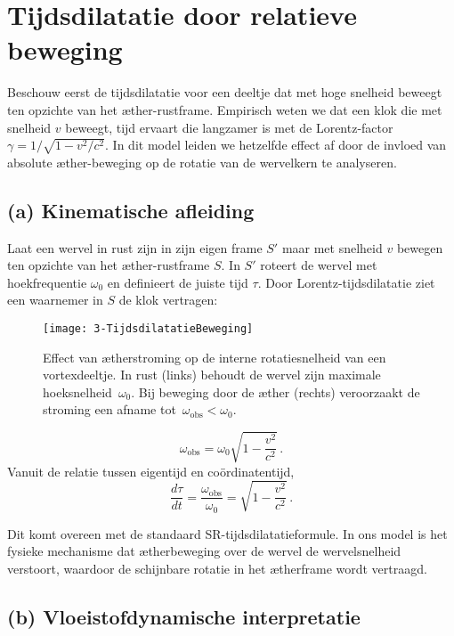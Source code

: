 \section{Tijdsdilatatie door relatieve beweging}

Beschouw eerst de tijdsdilatatie voor een deeltje dat met hoge snelheid beweegt ten opzichte van het æther-rustframe. Empirisch weten we dat een klok die met snelheid $v$ beweegt, tijd ervaart die langzamer is met de Lorentz-factor $\gamma = 1/\sqrt{1 - v^2/c^2}$. In dit model leiden we hetzelfde effect af door de invloed van absolute æther-beweging op de rotatie van de wervelkern te analyseren.

\subsection*{(a) Kinematische afleiding}

Laat een wervel in rust zijn in zijn eigen frame $S'$ maar met snelheid $v$ bewegen ten opzichte van het æther-rustframe $S$. In $S'$ roteert de wervel met hoekfrequentie $\omega_0$ en definieert de juiste tijd $\tau$. Door Lorentz-tijdsdilatatie ziet een waarnemer in $S$ de klok vertragen:

\begin{figure}[htbp]
    \centering
    \texttt{[image: 3-TijdsdilatatieBeweging]}
    \caption{Effect van ætherstroming op de interne rotatiesnelheid van een vortexdeeltje. In rust (links) behoudt de wervel zijn maximale hoeksnelheid~$\omega_0$. Bij beweging door de æther (rechts) veroorzaakt de stroming een afname tot~$\omega_{\mathrm{obs}} < \omega_0$.}
    \label{fig:TijdsdilatatieBeweging}
\end{figure}

\[
    \omega_{\text{obs}} = \omega_0 \sqrt{1 - \frac{v^2}{c^2}} \,.
\]
Vanuit de relatie tussen eigentijd en coördinatentijd,
\[
    \frac{d\tau}{dt} = \frac{\omega_{\text{obs}}}{\omega_0} = \sqrt{1 - \frac{v^2}{c^2}} \,. \tag{2}
\]

Dit komt overeen met de standaard SR-tijdsdilatatieformule. In ons model is het fysieke mechanisme dat ætherbeweging over de wervel de wervelsnelheid verstoort, waardoor de schijnbare rotatie in het ætherframe wordt vertraagd.

\subsection*{(b) Vloeistofdynamische interpretatie}


